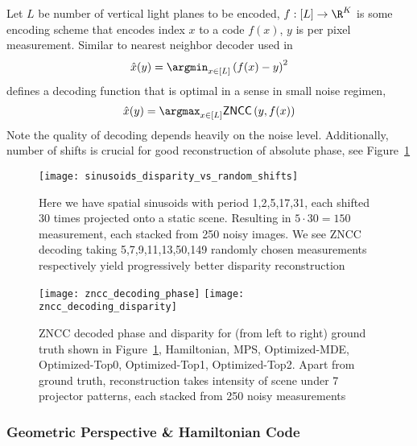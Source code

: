\documentclass[../writeup.tex]{subfiles}
\begin{document}
Let $L$ be number of vertical light planes to be encoded, $f:[L]\to\R^K$ is some encoding scheme that encodes index $x$ to a code $f(x)$, $y$ is per pixel measurement. Similar to nearest neighbor decoder used in \cite{hornOptimalStructuredLight1997}
\begin{align}
    \hat{x}(y)
        = \argmin_{x\in [L]} \left( f(x) - y \right)^2
    \label{eq:nearest_neighbor_decoder}
\end{align}
\cite{mirdehghanOptimalStructuredLight2018} defines a decoding function that is optimal in a sense in small noise regimen,
\begin{align}
    \hat{x}(y)
        = \argmax_{x\in[L]} \textsf{ZNCC}\left( y, f(x) \right)
    \label{eq:zncc_decoder}
\end{align}
Note the quality of decoding depends heavily on the noise level. Additionally, number of shifts is crucial for good reconstruction of absolute phase, see Figure~\ref{fig:sinusoids_disparity_vs_random_shifts}
\begin{figure}[h!]
    \begin{center}
        \texttt{[image: sinusoids\_disparity\_vs\_random\_shifts]}
    \end{center}
    \caption{Here we have spatial sinusoids with period 1,2,5,17,31, each shifted 30 times projected onto a static scene. Resulting in $5\cdot 30=150$ measurement, each stacked from 250 noisy images. We see ZNCC decoding taking 5,7,9,11,13,50,149 randomly chosen measurements respectively yield progressively better disparity reconstruction}
    \label{fig:sinusoids_disparity_vs_random_shifts}
\end{figure} 
\begin{figure}[h!]
    \begin{center}
        \texttt{[image: zncc\_decoding\_phase]}
        \texttt{[image: zncc\_decoding\_disparity]}
    \end{center}
    \caption{ZNCC decoded phase and disparity for (from left to right) ground truth shown in Figure~\ref{fig:sinusoids_disparity_vs_random_shifts}, Hamiltonian, MPS, Optimized-MDE, Optimized-Top0, Optimized-Top1, Optimized-Top2. Apart from ground truth, reconstruction takes intensity of scene under 7 projector patterns, each stacked from 250 noisy measurements}
    \label{fig:zncc_decoding_phase_disparity} 
\end{figure}   

\subsubsection{Geometric Perspective \& Hamiltonian Code} 
 
\end{document}
